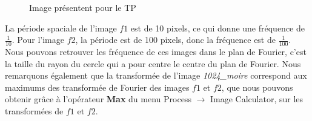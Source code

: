 \documentclass[a4paper,11pt]{article}
\begin{document}
  \begin{figure}[H]
   \centering
   \caption{Image présentent pour le TP}
  \end{figure}

  La période spaciale de l’image $f1$ est de 10 pixels, ce qui donne une fréquence de $\frac{1}{10}$. Pour l’image $f2$, la période est de 100 pixels, 
  donc la fréquence est de $\frac{1}{100}$. Nous pouvons retrouver les fréquence de ces images dans le plan de Fourier, c’est la taille du rayon du cercle 
  qui a pour centre le centre du plan de Fourier. Nous remarquons également que la transformée de l’image \textit{1024\_moire} correspond aux maximums  
  des transformée de Fourier des images $f1$ et $f2$, que nous pouvons obtenir grâce à l’opérateur \textbf{Max} du menu Process $\rightarrow$ Image Calculator, 
  sur les transformées de $f1$ et $f2$.\\
  
\end{document}
